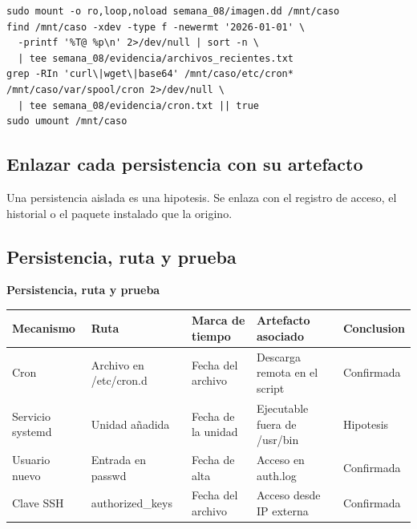 \documentclass[11pt,a4paper]{article}
\begin{document}
\begin{lstlisting}[style=estiloCodigo]
sudo mount -o ro,loop,noload semana_08/imagen.dd /mnt/caso
find /mnt/caso -xdev -type f -newermt '2026-01-01' \
  -printf '%T@ %p\n' 2>/dev/null | sort -n \
  | tee semana_08/evidencia/archivos_recientes.txt
grep -RIn 'curl\|wget\|base64' /mnt/caso/etc/cron* /mnt/caso/var/spool/cron 2>/dev/null \
  | tee semana_08/evidencia/cron.txt || true
sudo umount /mnt/caso
\end{lstlisting}

\subsection{Enlazar cada persistencia con su artefacto}

Una persistencia aislada es una hipotesis. Se enlaza con el registro de acceso, el historial o el paquete instalado que la origino.

\needspace{8\baselineskip}\subsection{Persistencia, ruta y prueba}

\begin{center}
\begin{minipage}{\linewidth}
\centering
{\footnotesize
\textbf{Persistencia, ruta y prueba}\par\smallskip
\begin{tabular}{@{}>{\raggedright\arraybackslash}p{2.60cm}>{\raggedright\arraybackslash}p{3.40cm}>{\raggedright\arraybackslash}p{2.40cm}>{\raggedright\arraybackslash}p{3.20cm}>{\raggedright\arraybackslash}p{2.20cm}@{}}
\toprule
\textbf{Mecanismo} & \textbf{Ruta} & \textbf{Marca de tiempo} & \textbf{Artefacto asociado} & \textbf{Conclusion} \\
\midrule
Cron & Archivo en /etc/cron.d & Fecha del archivo & Descarga remota en el script & Confirmada \\
Servicio systemd & Unidad añadida & Fecha de la unidad & Ejecutable fuera de /usr/bin & Hipotesis \\
Usuario nuevo & Entrada en passwd & Fecha de alta & Acceso en auth.log & Confirmada \\
Clave SSH & authorized\_keys & Fecha del archivo & Acceso desde IP externa & Confirmada \\
\bottomrule
\end{tabular}
}
\par{}
\end{minipage}
\end{center}
\end{document}
